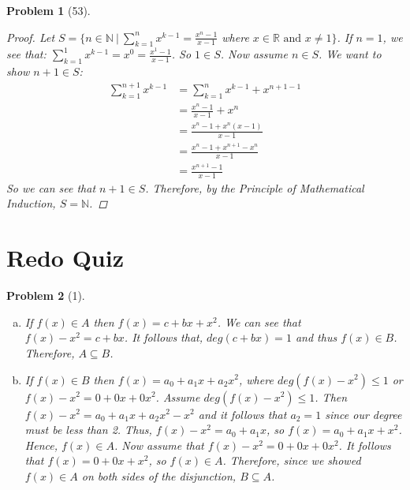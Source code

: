 \documentclass{article}
\theoremstyle{problem}
\newtheorem{prob}{Problem}
\theoremstyle{plain}
\theoremstyle{remark}
\begin{document}
\begin{prob}[53]\ \\[-1cm]

\begin{proof}
Let $S = \{n \in \mathbb{N}\ |\ \displaystyle \sum_{k = 1}^{n}{x^{k-1}}  = \frac{x^n - 1}{x - 1}$ where $x \in \mathbb{R}\text{ and }x \not = 1 \}$.
If $n = 1$, we see that: $\displaystyle \sum_{k = 1}^{1}{x^{k-1}}  = x^0 = \frac{x^1 - 1}{x - 1}$. So $1 \in S$. Now assume $n \in S$. We want to show $n+1 \in S$:
\begin{align*}
\displaystyle \sum_{k = 1}^{n+1}{x^{k-1}}  &= \displaystyle \sum_{k = 1}^{n}{x^{k-1}} + x^{n+1-1}\\
&= \frac{x^n - 1}{x-1} + x^n\\
&= \frac{x^n - 1 + x^n(x - 1)}{x - 1}\\
&= \frac{x^n - 1 + x^{n+1} - x^n}{x - 1}\\
&= \frac{x^{n+1} - 1}{x - 1}
\end{align*}
So we can see that $n + 1 \in S$. Therefore, by the Principle of Mathematical Induction, $S = \mathbb{N}$.
\end{proof}
\end{prob}
\section*{Redo Quiz}
\begin{prob}[1]\ \\[-1cm]
  \begin{enumerate}[a)]
  \item If $f(x) \in A$ then $f(x) = c + bx + x^2$. We can see that $f(x) - x^2 = c + bx$. It follows that, $deg(c + bx) = 1$ and thus $f(x) \in B$. Therefore, $A \subseteq B$.

  \item If $f(x) \in B$ then $f(x) = a_0 + a_1x + a_2x^2$, where $deg(f(x) - x^2) \leq 1$ or $f(x) - x^2 = 0 + 0x + 0x^2$. Assume $deg(f(x) - x^2) \leq 1$. Then $f(x) - x^2 = a_0 + a_1x + a_2x^2 - x^2$ and it follows that $a_2 = 1$ since our degree must be less than 2. Thus, $f(x) - x^2 = a_0 + a_1x$, so $f(x) = a_0 + a_1x + x^2$. Hence, $f(x) \in A$. Now assume that $f(x) - x^2 = 0 + 0x + 0x^2$. It follows that $f(x) = 0 + 0x + x^2$, so $f(x) \in A$. Therefore, since we showed $f(x) \in A$ on both sides of the disjunction, $B \subseteq A$.
  \end{enumerate}
\end{prob}
\end{document}
